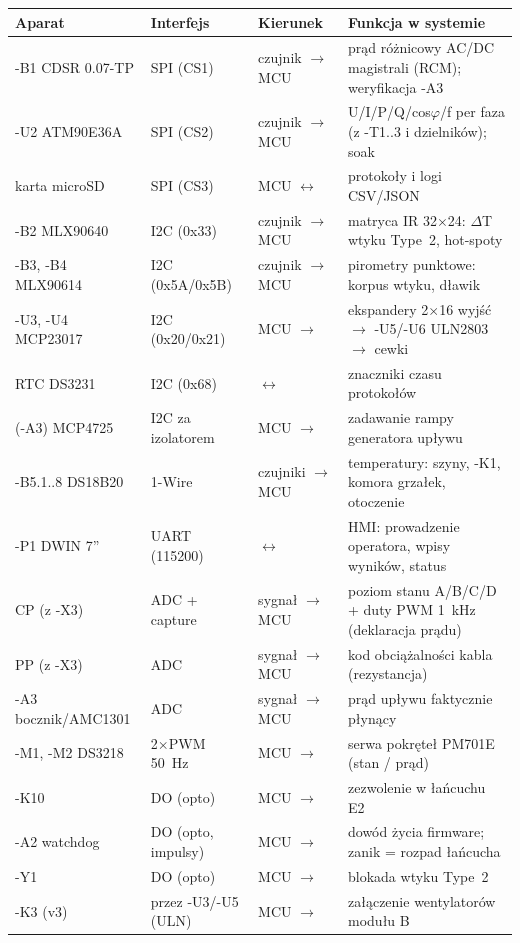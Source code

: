 \documentclass[11pt,a4paper]{article}
\begin{document}
\begin{longtable}{@{}p{}p{}p{}p{}@{}}
\toprule
\textbf{Aparat} & \textbf{Interfejs} & \textbf{Kierunek} & \textbf{Funkcja w systemie}\\
\midrule
\endhead
-B1 CDSR 0.07-TP & SPI (CS1) & czujnik $\to$ MCU & prąd różnicowy AC/DC magistrali (RCM); weryfikacja -A3\\
-U2 ATM90E36A & SPI (CS2) & czujnik $\to$ MCU & U/I/P/Q/cos$\varphi$/f per faza (z -T1..3 i dzielników); soak\\
karta microSD & SPI (CS3) & MCU $\leftrightarrow$ & protokoły i logi CSV/JSON\\
-B2 MLX90640 & I2C (0x33) & czujnik $\to$ MCU & matryca IR 32$\times$24: $\Delta$T wtyku Type~2, hot-spoty\\
-B3, -B4 MLX90614 & I2C (0x5A/0x5B) & czujnik $\to$ MCU & pirometry punktowe: korpus wtyku, dławik\\
-U3, -U4 MCP23017 & I2C (0x20/0x21) & MCU $\to$ & ekspandery 2$\times$16 wyjść $\to$ -U5/-U6 ULN2803 $\to$ cewki\\
RTC DS3231 & I2C (0x68) & $\leftrightarrow$ & znaczniki czasu protokołów\\
(-A3) MCP4725 & I2C za izolatorem & MCU $\to$ & zadawanie rampy generatora upływu\\
-B5.1..8 DS18B20 & 1-Wire & czujniki $\to$ MCU & temperatury: szyny, -K1, komora grzałek, otoczenie\\
-P1 DWIN 7'' & UART (115200) & $\leftrightarrow$ & HMI: prowadzenie operatora, wpisy wyników, status\\
CP (z -X3) & ADC + capture & sygnał $\to$ MCU & poziom stanu A/B/C/D + duty PWM 1~kHz (deklaracja prądu)\\
PP (z -X3) & ADC & sygnał $\to$ MCU & kod obciążalności kabla (rezystancja)\\
-A3 bocznik/AMC1301 & ADC & sygnał $\to$ MCU & prąd upływu faktycznie płynący\\
-M1, -M2 DS3218 & 2$\times$PWM 50~Hz & MCU $\to$ & serwa pokręteł PM701E (stan / prąd)\\
-K10 & DO (opto) & MCU $\to$ & zezwolenie w łańcuchu E2\\
-A2 watchdog & DO (opto, impulsy) & MCU $\to$ & dowód życia firmware; zanik = rozpad łańcucha\\
-Y1 & DO (opto) & MCU $\to$ & blokada wtyku Type~2\\
-K3 (v3) & przez -U3/-U5 (ULN) & MCU $\to$ & załączenie wentylatorów modułu B\\

\end{longtable}
\end{document}
